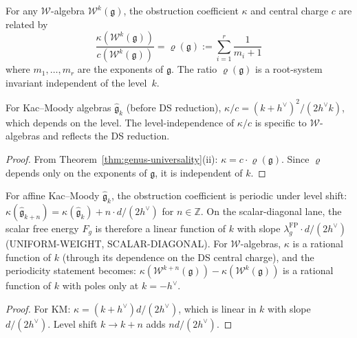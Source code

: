 \begin{corollary}
\label{cor:anomaly-ratio}
For any $\mathcal{W}$-algebra $\mathcal{W}^k(\mathfrak{g})$, the obstruction coefficient $\kappa$ and central charge $c$ are related by
\begin{equation}\label{eq:anomaly-ratio}
\frac{\kappa(\mathcal{W}^k(\mathfrak{g}))}{c(\mathcal{W}^k(\mathfrak{g}))} = \varrho(\mathfrak{g}) := \sum_{i=1}^r \frac{1}{m_i + 1}
\end{equation}
where $m_1, \ldots, m_r$ are the exponents of $\mathfrak{g}$. The ratio $\varrho(\mathfrak{g})$ is a root-system invariant independent of the level~$k$.

For Kac--Moody algebras $\widehat{\mathfrak{g}}_k$ (before DS reduction), $\kappa/c = (k+h^\vee)^2/(2h^\vee k)$, which depends on the level. The level-independence of $\kappa/c$ is specific to $\mathcal{W}$-algebras and reflects the DS reduction.
\end{corollary}

\begin{proof}
From Theorem~\ref{thm:genus-universality}(ii): $\kappa = c \cdot \varrho(\mathfrak{g})$. Since $\varrho$ depends only on the exponents of $\mathfrak{g}$, it is independent of $k$.
\end{proof}

\begin{corollary}
\label{cor:kappa-periodicity}
For affine Kac--Moody $\widehat{\mathfrak{g}}_k$, the obstruction
coefficient is periodic under level shift:
$\kappa(\widehat{\mathfrak{g}}_{k+n})
= \kappa(\widehat{\mathfrak{g}}_k) + n \cdot d/(2h^\vee)$ for
$n \in \mathbb{Z}$. On the scalar-diagonal lane, the scalar free
energy $F_g$ is therefore a linear function of $k$ with slope
$\lambda_g^{\mathrm{FP}} \cdot d/(2h^\vee)$
\textup{(}UNIFORM-WEIGHT, SCALAR-DIAGONAL\textup{}).
For $\mathcal{W}$-algebras, $\kappa$ is a rational function of $k$
\textup{(}through its dependence on the DS central charge\textup{)},
and the periodicity statement becomes:
$\kappa(\mathcal{W}^{k+n}(\mathfrak{g}))
- \kappa(\mathcal{W}^k(\mathfrak{g}))$ is a rational function of $k$
with poles only at $k = -h^\vee$.
\end{corollary}

\begin{proof}
For KM: $\kappa = (k+h^\vee)d/(2h^\vee)$, which is linear in $k$ with slope $d/(2h^\vee)$. Level shift $k \to k+n$ adds $nd/(2h^\vee)$.
\end{proof}

